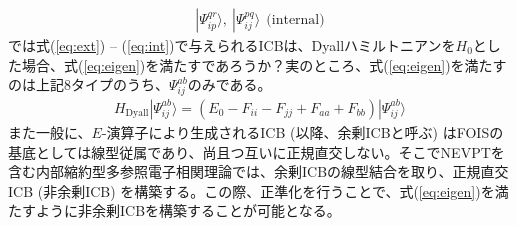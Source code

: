 \documentclass[11pt,pra,aps]{revtex4}
\begin{document}
\begin{align}
  |\Psi_{ip}^{qr}\rangle,\ |\Psi_{ij}^{pq}\rangle \ \ \text{(internal)} \label{eq:int}
\end{align}
では式(\ref{eq:ext}) -- (\ref{eq:int})で与えられるICBは、Dyallハミルトニアンを$H_0$とした場合、式(\ref{eq:eigen})を満たすであろうか？実のところ、式(\ref{eq:eigen})を満たすのは上記8タイプのうち、$\Psi_{ij}^{ab}$のみである。
\begin{align}
  H_\text{Dyall}|\Psi_{ij}^{ab}\rangle=\left(E_0-F_{ii}-F_{jj}+F_{aa}+F_{bb}\right)|\Psi_{ij}^{ab}\rangle
\end{align}
また一般に、$E$-演算子により生成されるICB (以降、余剰ICBと呼ぶ) はFOISの基底としては線型従属であり、尚且つ互いに正規直交しない。そこでNEVPTを含む内部縮約型多参照電子相関理論では、余剰ICBの線型結合を取り、正規直交ICB (非余剰ICB) を構築する。この際、正準化を行うことで、式(\ref{eq:eigen})を満たすように非余剰ICBを構築することが可能となる。
\end{document}
